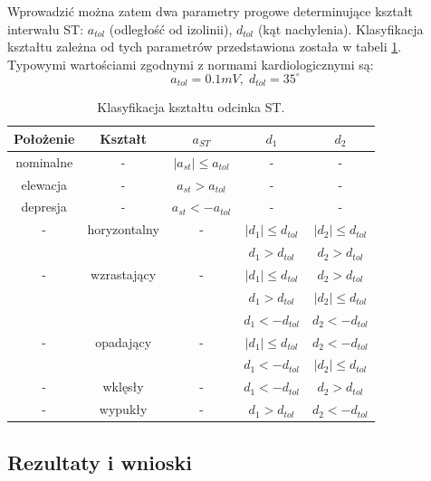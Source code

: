 Wprowadzić można zatem dwa parametry progowe determinujące kształt interwału ST: $ a_{tol} $ (odległość od izolinii), $ d_{tol} $ (kąt nachylenia). Klasyfikacja kształtu zależna od tych parametrów przedstawiona została w tabeli \ref{tab:ST_klasyfikacjaST}. Typowymi wartościami zgodnymi z normami kardiologicznymi \cite{STInt2} są:
\[ a_{tol} = 0.1 mV, \; d_{tol} = 35^\circ  \]
\begin{table}[H]
	\centering
	\caption{Klasyfikacja kształtu odcinka ST.}
	\label{tab:ST_klasyfikacjaST}
	\begin{tabular}{|c|c|c|c|c|}
	\hline
	Położenie & Kształt & $ a_{ST} $ & $ d_1 $ & $ d_2 $ \\ \hline
	nominalne	&	-	&	$ \left| a_{st} \right| \leq a_{tol} $	&	-	&	- \\ \hline
	elewacja	&	-	&	$ a_{st} > a_{tol} $					&	-	&	- \\ \hline
	depresja	&	-	&	$ a_{st} < -a_{tol} $					&	-	&	- \\ \hline
	- & horyzontalny & - & $ \left| d_1 \right| \leq d_{tol} $ & $ \left| d_2 \right| \leq d_{tol} $ \\ \hline
	\multirow{3}{*}{-} & \multirow{3}{*}{wzrastający} & \multirow{3}{*}{-} & $ d_1 > d_{tol} $						&	$ d_2 > d_{tol} $ \\ \cline{4-5}
	& & & $ \left| d_1 \right| \leq d_{tol} $	&	$ d_2 > d_{tol} $					\\ \cline{4-5}
	& & & $ d_1 > d_{tol} $						&	$ \left| d_2 \right| \leq d_{tol} $	\\ \hline
	\multirow{3}{*}{-} & \multirow{3}{*}{opadający} & \multirow{3}{*}{-} & $ d_1 < -d_{tol} $						&	$ d_2 < -d_{tol} $ \\ \cline{4-5}
	& & & $ \left| d_1 \right| \leq d_{tol} $	&	$ d_2 < -d_{tol} $					\\ \cline{4-5}
	& & & $ d_1 < -d_{tol} $					&	$ \left| d_2 \right| \leq d_{tol} $	\\ \hline
		-	&	wklęsły		&	-	&	$ d_1 < -d_{tol} $	&	$ d_2 > d_{tol} $	\\ \hline
		-	&	wypukły		&	-	&	$ d_1 > d_{tol}	$	&	$ d_2 < -d_{tol}$	\\ \hline
	\end{tabular}
\end{table}

\subsection{Rezultaty i wnioski}
